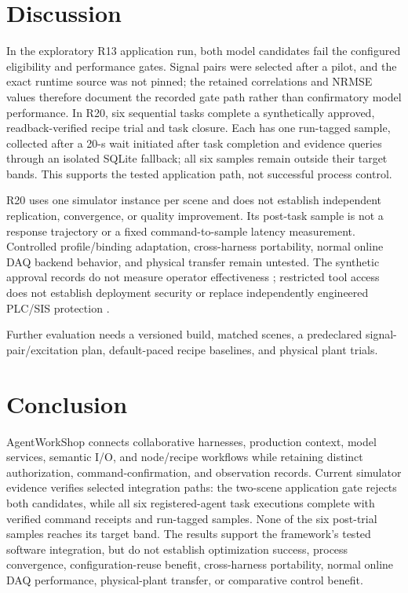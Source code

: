 \section{Discussion}
\label{sec:limits}
In the exploratory R13 application run, both model candidates fail the
configured eligibility and performance gates. Signal pairs were selected
after a pilot, and the exact runtime source was not pinned; the retained
correlations and NRMSE values therefore document the recorded gate path rather
than confirmatory model performance. In R20, six sequential tasks complete a
synthetically approved, readback-verified recipe trial and task closure. Each
has one run-tagged sample, collected after a 20-s wait initiated after task
completion and evidence queries through an isolated SQLite fallback; all six
samples remain outside their target bands. This supports the tested
application path, not successful process control.

R20 uses one simulator instance per scene and does not establish independent
replication, convergence, or quality improvement. Its post-task sample is not
a response trajectory or a fixed command-to-sample latency measurement.
Controlled profile/binding adaptation, cross-harness portability, normal
online DAQ backend behavior, and physical transfer remain untested. The
synthetic approval records do not measure operator effectiveness
\cite{parasuramanmanzey2010complacency,parasuraman2000model,bainbridge1983ironies};
restricted tool access does not establish deployment security
\cite{greshake2023injection,liu2024pinjection,iec62443-3-3} or replace
independently engineered PLC/SIS protection \cite{iec61511}.

Further evaluation needs a versioned build, matched scenes, a predeclared
signal-pair/excitation plan, default-paced recipe baselines, and physical
plant trials.

\section{Conclusion}
\label{sec:conclusion}
AgentWorkShop connects collaborative harnesses, production context, model
services, semantic I/O, and node/recipe workflows while retaining distinct
authorization, command-confirmation, and observation records. Current
simulator evidence verifies selected integration paths: the two-scene
application gate rejects both candidates, while all six registered-agent task
executions
complete with verified command receipts and run-tagged samples. None of the
six post-trial samples reaches its target band. The results support the
framework's tested software integration, but do not establish optimization
success, process convergence, configuration-reuse benefit, cross-harness
portability, normal online DAQ performance, physical-plant transfer, or
comparative control benefit.
